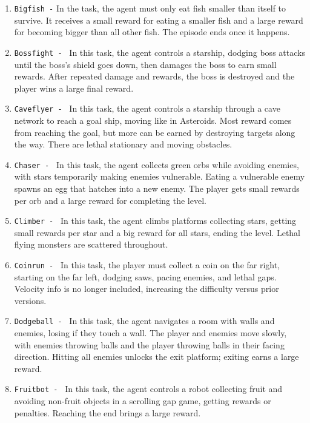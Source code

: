 \begin{enumerate}
    \item \texttt{Bigfish -} In the task, the agent must only eat fish smaller than itself to survive. It receives a small reward for eating a smaller fish and a large reward for becoming bigger than all other fish. The episode ends once it happens. 
    \item \texttt{Bossfight - } In this task, the agent controls a starship, dodging boss attacks until the boss's shield goes down, then damages the boss to earn small rewards. After repeated damage and rewards, the boss is destroyed and the player wins a large final reward.

    \item \texttt{Caveflyer - } In this task, the agent controls a starship through a cave network to reach a goal ship, moving like in Asteroids. Most reward comes from reaching the goal, but more can be earned by destroying targets along the way. There are lethal stationary and moving obstacles.

    \item \texttt{Chaser - } In this task, the agent collects green orbs while avoiding enemies, with stars temporarily making enemies vulnerable. Eating a vulnerable enemy spawns an egg that hatches into a new enemy. The player gets small rewards per orb and a large reward for completing the level.
    
    \item \texttt{Climber - } In this task, the agent climbs platforms collecting stars, getting small rewards per star and a big reward for all stars, ending the level. Lethal flying monsters are scattered throughout.
    
    \item \texttt{Coinrun - } In this task, the player must collect a coin on the far right, starting on the far left, dodging saws, pacing enemies, and lethal gaps. Velocity info is no longer included, increasing the difficulty versus prior versions.
    
    \item \texttt{Dodgeball - } In this task, the agent navigates a room with walls and enemies, losing if they touch a wall. The player and enemies move slowly, with enemies throwing balls and the player throwing balls in their facing direction. Hitting all enemies unlocks the exit platform; exiting earns a large reward.
    \item \texttt{Fruitbot - } In this task, the agent controls a robot collecting fruit and avoiding non-fruit objects in a scrolling gap game, getting rewards or penalties. Reaching the end brings a large reward. 
    

\end{enumerate}
